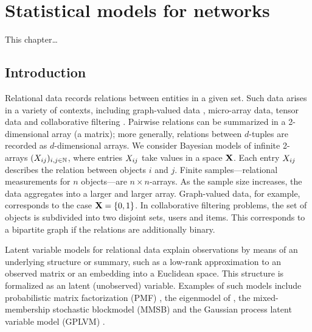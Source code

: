 
\inbpdocument

\chapter{Statistical models for networks}
\label{ch:networks}

This chapter\dots

\section{Introduction}


Relational data records relations between entities in a given set. Such data
arises in a variety of contexts, including graph-valued data 
\citep[e.g.][]{Airoldi2008,Hoff2002}, micro-array data, tensor data 
\citep[e.g.][]{Xu:Yan:Qi:2012} and collaborative filtering
\citep[e.g.][]{Salakhutdinov2008}.
Pairwise relations can be summarized in a 2-dimensional array (a matrix);
more generally, relations between $d$-tuples are recorded as $d$-dimensional arrays.
We consider Bayesian models of infinite 2-arrays $(X_{ij})_{i,j\in\mathbb{N}}$, where entries $X_{ij}$ take values in a space $\mathbf{X}$. 
Each entry $X_{ij}$ describes the relation between objects $i$ and $j$. Finite
samples---relational measurements for $n$ objects---are $n\times n$-arrays. As the sample size increases, the data aggregates into
a larger and larger array. 
Graph-valued data, for example, corresponds to the case $\mathbf{X}=\lbrace{0,1}\rbrace$.
In collaborative filtering problems, the set of objects
is subdivided into two disjoint sets, \eg users and items. This corresponds to a bipartite graph if the relations are additionally binary.

Latent variable models for relational data explain observations by means of an underlying structure
or summary,
such as a low-rank approximation to an observed matrix or an embedding into a Euclidean space.
This structure is formalized as an latent (unobserved) variable.
Examples of such models include probabilistic matrix factorization (PMF) \citep{Salakhutdinov2008}, the eigenmodel of 
\citet{Hoff2007a}, the mixed-membership stochastic blockmodel (MMSB) \citep{Airoldi2008}
and the Gaussian process latent variable model (GPLVM) \citep[e.g.][]{Lawrence2009}.


